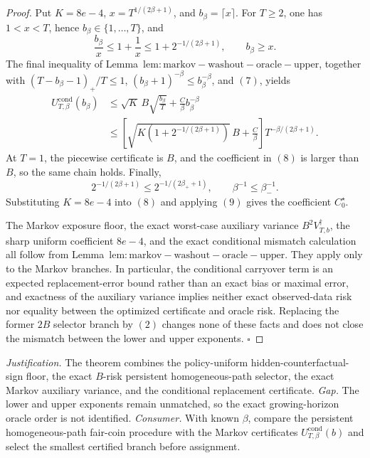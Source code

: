 \documentclass{article}
\begin{document}
\begin{proof}
Put \(K=8e-4\), \(x=T^{1/(2\beta+1)}\), and \(b_\beta=\lceil x\rceil\). For \(T\ge2\), one has \(1<x<T\), hence \(b_\beta\in\{1,\ldots,T\}\), and
\[
\frac{b_\beta}{x}\le1+\frac1x\le1+2^{-1/(2\beta+1)},
\qquad b_\beta\ge x.
\tag{7}
\]
The final inequality of Lemma~\(\mathrm{lem:markov-washout-oracle-upper}\), together with \((T-b_\beta-1)_+/T\le1\), \((b_\beta+1)^{-\beta}\le b_\beta^{-\beta}\), and \((7)\), yields
\[
\begin{aligned}
U_{T,\beta}^{\mathrm{cond}}(b_\beta)
&\le\sqrt K\,B\sqrt{\frac{b_\beta}{T}}+\frac C\beta b_\beta^{-\beta}\\
&\le\left[\sqrt{K\left(1+2^{-1/(2\beta+1)}\right)}\,B+\frac C\beta\right]T^{-\beta/(2\beta+1)}.
\end{aligned}
\tag{8}
\]
At \(T=1\), the piecewise certificate is \(B\), and the coefficient in \((8)\) is larger than \(B\), so the same chain holds. Finally,
\[
2^{-1/(2\beta+1)}\le2^{-1/(2\beta_++1)},
\qquad \beta^{-1}\le\beta_-^{-1}.
\tag{9}
\]
Substituting \(K=8e-4\) into \((8)\) and applying \((9)\) gives the coefficient \(C_0^\star\).

The Markov exposure floor, the exact worst-case auxiliary variance \(B^2V_{T,b}^{\dagger}\), the sharp uniform coefficient \(8e-4\), and the exact conditional mismatch calculation all follow from Lemma~\(\mathrm{lem:markov-washout-oracle-upper}\). They apply only to the Markov branches. In particular, the conditional carryover term is an expected replacement-error bound rather than an exact bias or maximal error, and exactness of the auxiliary variance implies neither exact observed-data risk nor equality between the optimized certificate and oracle risk. Replacing the former \(2B\) selector branch by \((2)\) changes none of these facts and does not close the mismatch between the lower and upper exponents. \(\square\)
\end{proof}
\par\smallskip\noindent \textit{Justification.} The theorem combines the policy-uniform hidden-counterfactual-sign floor, the exact \(B\)-risk persistent homogeneous-path selector, the exact Markov auxiliary variance, and the conditional replacement certificate. \textit{Gap.} The lower and upper exponents remain unmatched, so the exact growing-horizon oracle order is not identified. \textit{Consumer.} With known \(\beta\), compare the persistent homogeneous-path fair-coin procedure with the Markov certificates \(U_{T,\beta}^{\mathrm{cond}}(b)\) and select the smallest certified branch before assignment.
\end{document}

